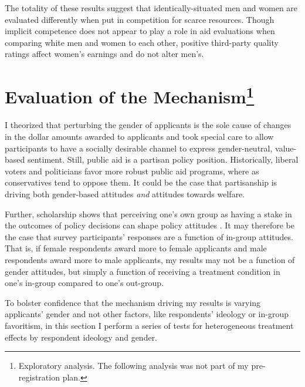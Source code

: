 \documentclass[12pt]{article}%
\begin{document}
\begin{doublespace}
The totality of these results suggest that identically-situated men and women are evaluated differently when put in competition for scarce resources. Though implicit competence does not appear to play a role in aid evaluations when comparing white men and women to each other, positive third-party quality ratings affect women’s earnings and do not alter men’s.

\section*{Evaluation of the Mechanism\footnote{Exploratory analysis. The following analysis was not part of my pre-registration plan.}}
I theorized that perturbing the gender of applicants is the sole cause of changes in the dollar amounts awarded to applicants and took special care to allow participants to have a socially desirable channel to express gender-neutral, value-based sentiment. Still, public aid is a partisan policy position. Historically, liberal voters and politicians favor more robust public aid programs, where as conservatives tend to oppose them. It could be the case that partisanship is driving both gender-based attitudes \textit{and} attitudes towards welfare. 

Further, scholarship shows that perceiving one's own group as having a stake in the outcomes of policy decisions can shape policy attitudes \citep{wolpert1998self, smith198075}. It may therefore be the case that survey participants' responses are a function of in-group attitudes. That is, if female respondents award more to female applicants and male respondents award more to male applicants, my results may not be a function of gender attitudes, but simply a function of receiving a treatment condition in one's in-group compared to one's out-group. 

To bolster confidence that the mechanism driving my results is varying applicants' gender and not other factors, like respondents' ideology or in-group favoritism, in this section I perform a series of tests for heterogeneous treatment effects by respondent ideology and gender.


\end{doublespace}
\end{document}
